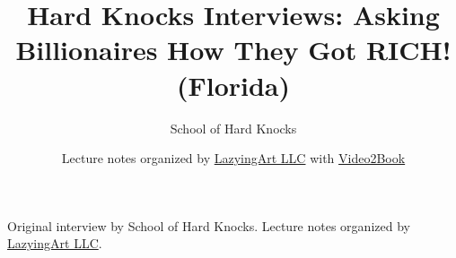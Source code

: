 \documentclass[11pt,oneside]{book}
\begin{document}
\frontmatter
\title{Hard Knocks Interviews: Asking Billionaires How They Got RICH! (Florida)}
\author{School of Hard Knocks}
\date{Lecture notes organized by \href{https://lazying.art}{LazyingArt LLC} with \href{https://github.com/lachlanchen/Video2Book}{Video2Book}}
\maketitle
\begin{center}
\small Original interview by School of Hard Knocks. Lecture notes organized by \href{https://lazying.art}{LazyingArt LLC}.
\end{center}
\clearpage
\mainmatter

\end{document}
